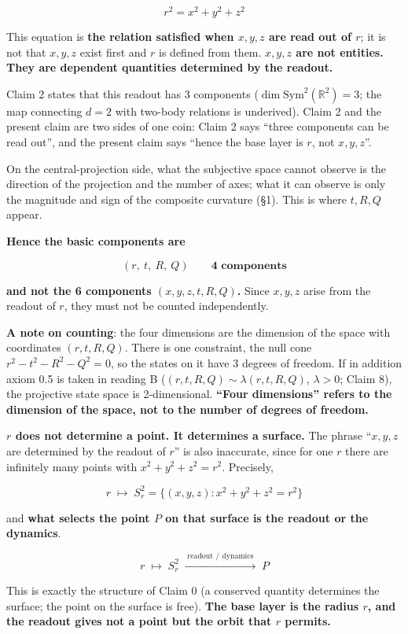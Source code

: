 \documentclass[
  10pt,
]{article}
\begin{document}
\[r^2 = x^2 + y^2 + z^2\]

This equation is \textbf{the relation satisfied when \(x, y, z\) are
read out of \(r\)}; it is not that \(x, y, z\) exist first and \(r\) is
defined from them. \textbf{\(x, y, z\) are not entities. They are
dependent quantities determined by the readout.}

Claim 2 states that this readout has 3 components
(\(\dim\mathrm{Sym}^2(\mathbb{R}^2) = 3\); the map connecting \(d=2\)
with two-body relations is underived). Claim 2 and the present claim are
two sides of one coin: Claim 2 says ``three components can be read
out'', and the present claim says ``hence the base layer is \(r\), not
\(x,y,z\)''.

On the central-projection side, what the subjective space cannot observe
is the direction of the projection and the number of axes; what it can
observe is only the magnitude and sign of the composite curvature (§1).
This is where \(t, R, Q\) appear.

\textbf{Hence the basic components are}

\[(r,\ t,\ R,\ Q) \qquad \textbf{4 components}\]

\textbf{and not the 6 components \((x, y, z, t, R, Q)\).} Since
\(x, y, z\) arise from the readout of \(r\), they must not be counted
independently.

\textbf{A note on counting}: the four dimensions are the dimension of
the space with coordinates \((r,t,R,Q)\). There is one constraint, the
null cone \(r^2-t^2-R^2-Q^2=0\), so the states on it have 3 degrees of
freedom. If in addition axiom 0.5 is taken in reading B
(\((r,t,R,Q)\sim\lambda(r,t,R,Q)\), \(\lambda>0\); Claim 8), the
projective state space is 2-dimensional. \textbf{``Four dimensions''
refers to the dimension of the space, not to the number of degrees of
freedom.}

\textbf{\(r\) does not determine a point. It determines a surface.} The
phrase ``\(x,y,z\) are determined by the readout of \(r\)'' is also
inaccurate, since for one \(r\) there are infinitely many points with
\(x^2+y^2+z^2 = r^2\). Precisely,

\[\boxed{\;r \;\longmapsto\; S_r^2 = \{(x,y,z) : x^2+y^2+z^2 = r^2\}\;}\]

and \textbf{what selects the point \(P\) on that surface is the readout
or the dynamics}.

\[r \;\longmapsto\; S_r^2 \;\xrightarrow{\;\text{readout / dynamics}\;}\; P\]

This is exactly the structure of Claim 0 (a conserved quantity
determines the surface; the point on the surface is free). \textbf{The
base layer is the radius \(r\), and the readout gives not a point but
the orbit that \(r\) permits.}
\end{document}
